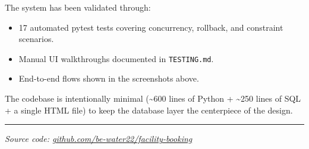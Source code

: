 \documentclass[11pt,a4paper]{article}
\begin{document}
The system has been validated through:
\begin{itemize}[leftmargin=*]
    \item 17 automated pytest tests covering concurrency, rollback, and constraint scenarios.
    \item Manual UI walkthroughs documented in \texttt{TESTING.md}.
    \item End-to-end flows shown in the screenshots above.
\end{itemize}

The codebase is intentionally minimal (\textasciitilde 600 lines of Python + \textasciitilde 250 lines of SQL + a single HTML file) to keep the database layer the centerpiece of the design.

\vspace{1cm}
\hrule
\vspace{0.3cm}
\centering
\textit{Source code: \href{https://github.com/be-water22/facility-booking}{github.com/be-water22/facility-booking}}
\end{document}
